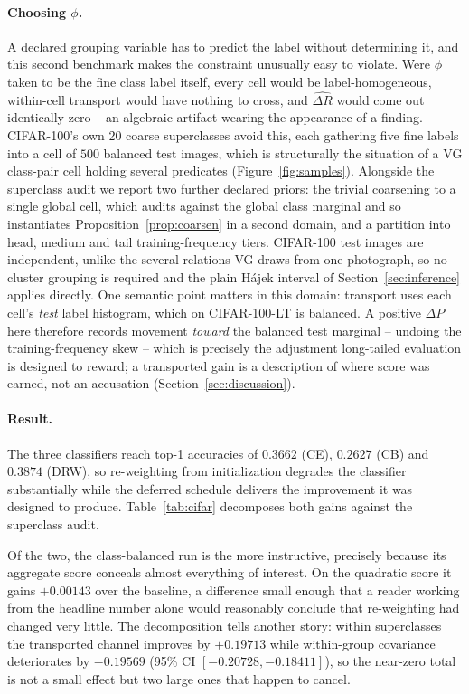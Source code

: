\paragraph{Choosing $\phi$.} A declared grouping variable has to predict the label without
determining it, and this second benchmark makes the constraint unusually easy to
violate. Were $\phi$ taken to be the fine class label itself, every cell would be
label-homogeneous, within-cell transport would have nothing to cross, and
$\widehat{\Delta R}$ would come out identically zero -- an algebraic artifact wearing the
appearance of a finding. CIFAR-100's own 20 coarse superclasses avoid this, each
gathering five fine labels into a cell of $500$ balanced test images, which is
structurally the situation of a VG class-pair cell holding several predicates
(Figure~\ref{fig:samples}). Alongside the superclass audit we report two further
declared priors: the trivial coarsening to a single global cell, which audits against
the global class marginal and so instantiates Proposition~\ref{prop:coarsen} in a second
domain, and a partition into head, medium and tail training-frequency tiers. CIFAR-100
test images are independent, unlike the several relations VG draws from one photograph,
so no cluster grouping is required and the plain H\'ajek interval of
Section~\ref{sec:inference} applies directly. One semantic point matters in this domain:
transport uses each cell's \emph{test} label histogram, which on CIFAR-100-LT is
balanced. A positive $\Delta P$ here therefore records movement \emph{toward} the
balanced test marginal -- undoing the training-frequency skew -- which is precisely the
adjustment long-tailed evaluation is designed to reward; a transported gain is a
description of where score was earned, not an accusation
(Section~\ref{sec:discussion}).

\paragraph{Result.} The three classifiers reach top-1 accuracies of $0.3662$ (CE),
$0.2627$ (CB) and $0.3874$ (DRW), so re-weighting from initialization degrades the
classifier substantially while the deferred schedule delivers the improvement it was
designed to produce. Table~\ref{tab:cifar} decomposes both gains against the superclass
audit.

Of the two, the class-balanced run is the more instructive, precisely because its
aggregate score conceals almost everything of interest. On the quadratic score it gains
$+0.00143$ over the baseline, a difference small enough that a reader working from the
headline number alone would reasonably conclude that re-weighting had changed very
little. The decomposition tells another story: within superclasses the
transported channel improves by $+0.19713$ while within-group covariance deteriorates
by $-0.19569$ (95\% CI $[-0.20728,-0.18411]$), so the near-zero total is not a small
effect but two large ones that happen to cancel.

